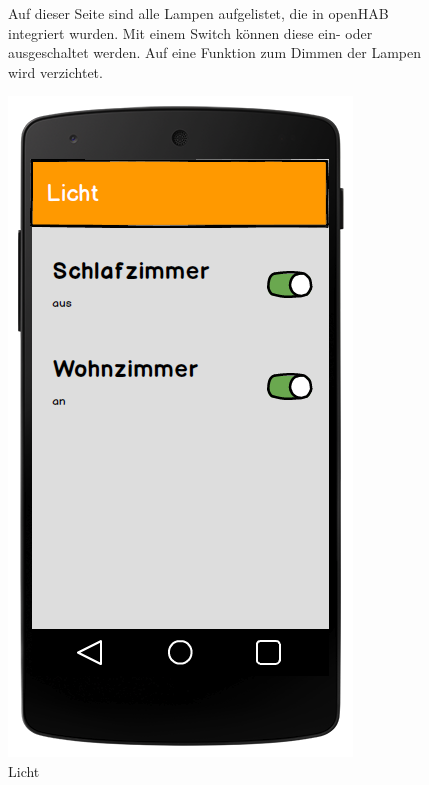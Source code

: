 \begin{figure}[htbp]
	\begin{minipage}{0.6\textwidth} 
Auf dieser Seite sind alle Lampen aufgelistet, die in openHAB integriert wurden. Mit einem Switch können diese ein- oder ausgeschaltet werden. Auf eine Funktion zum Dimmen der Lampen wird verzichtet.
	\end{minipage}
	\hfill
	\begin{minipage}{0.32\textwidth}
		\includegraphics[width=\textwidth]{report/img/mockup_light.png}
		\caption{Licht}
		\label{fig:mockupLight}
	\end{minipage}
\end{figure}

